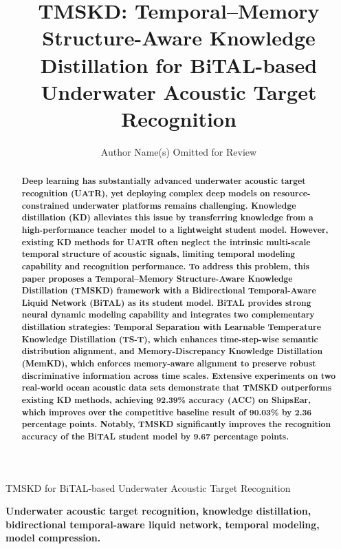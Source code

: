 ﻿\documentclass[lettersize,journal]{IEEEtran}
\begin{document}
\title{TMSKD: Temporal--Memory Structure-Aware Knowledge Distillation for BiTAL-based Underwater Acoustic Target Recognition}

\author{Author Name(s) Omitted for Review}

%
{TMSKD for BiTAL-based Underwater Acoustic Target Recognition}

\maketitle

\begin{abstract}
\bfseries
Deep learning has substantially advanced underwater acoustic target recognition (UATR), yet deploying complex deep models on resource-constrained underwater platforms remains challenging. Knowledge distillation (KD) alleviates this issue by transferring knowledge from a high-performance teacher model to a lightweight student model. However, existing KD methods for UATR often neglect the intrinsic multi-scale temporal structure of acoustic signals, limiting temporal modeling capability and recognition performance. To address this problem, this paper proposes a Temporal--Memory Structure-Aware Knowledge Distillation (TMSKD) framework with a Bidirectional Temporal-Aware Liquid Network (BiTAL) as its student model. BiTAL provides strong neural dynamic modeling capability and integrates two complementary distillation strategies: Temporal Separation with Learnable Temperature Knowledge Distillation (TS-T), which enhances time-step-wise semantic distribution alignment, and Memory-Discrepancy Knowledge Distillation (MemKD), which enforces memory-aware alignment to preserve robust discriminative information across time scales. Extensive experiments on two real-world ocean acoustic data sets demonstrate that TMSKD outperforms existing KD methods, achieving 92.39\% accuracy (ACC) on ShipsEar, which improves over the competitive baseline result of 90.03\% by 2.36 percentage points. Notably, TMSKD significantly improves the recognition accuracy of the BiTAL student model by 9.67 percentage points.
\end{abstract}

\begin{IEEEkeywords}
\bfseries
Underwater acoustic target recognition, knowledge distillation, bidirectional temporal-aware liquid network, temporal modeling, model compression.
\end{IEEEkeywords}
\end{document}
